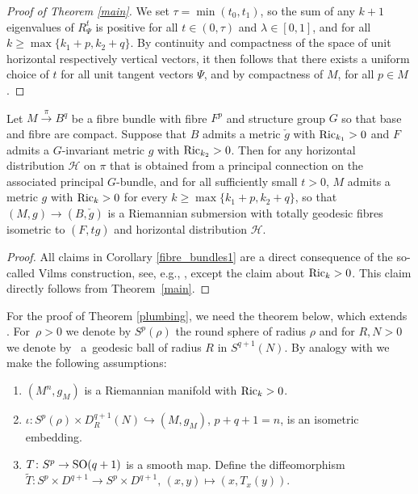 \begin{proof}[Proof of Theorem \ref{main}]
	We set $\tau=\min(t_0,t_1)$, so the sum of any $k+1$ eigenvalues of $R_\Psi^t$ is positive for all $t\in(0,\tau)$ and $\lambda\in[0,1]$, and for all $k\geq \max\{k_1+p,k_2+q\}$. By continuity and compactness of the space of unit horizontal respectively vertical vectors, it then follows that there exists a uniform choice of $t$ for all unit tangent vectors $\Psi$, and by compactness of $M$, for all $p\in M$.
\end{proof}


\begin{Corollary}\label{fibre_bundles1}
	Let $M\xrightarrow{\pi}B^q$ be a fibre bundle with fibre $F^p$ and structure group $G$ so that base and fibre are compact. Suppose that $B$ admits a metric $\check{g}$ with ${\rm Ric}_{k_1}>0$ and $F$ admits a $G$-invariant metric $\hat{g}$ with ${\rm Ric}_{k_2}>0$. Then for any horizontal distribution $\mathcal{H}$ on $\pi$ that is obtained from a principal connection on the associated principal $G$-bundle, and for all sufficiently small $t>0$, $M$ admits a metric $g$ with ${\rm Ric}_k>0$ for every $k\ge \max\{k_1+p,k_2+q\}$, so that $(M,g)\to (B,\check{g})$ is a Riemannian submersion with totally geodesic fibres isometric to $(F,t\hat{g})$ and horizontal distribution $\mathcal{H}$.
\end{Corollary}

\begin{proof}
	All claims in Corollary \ref{fibre_bundles1} are a direct consequence of the so-called Vilms construction, see, e.g., \cite[Theorem~9.59]{Be}, except the claim about ${\rm Ric}_k>0$. This claim directly follows from Theorem~\ref{main}.
\end{proof}

For the proof of Theorem \ref{plumbing}, we need the theorem below, which extends \cite[Theorem~C]{RW}. For~${\rho>0}$ we denote by $S^p(\rho)$ the round sphere of radius $\rho$ and for $R,N>0$ we denote by~ a~geodesic ball of radius $R$ in $S^{q+1}(N)$. By analogy with \cite{Wr2} we make the following assumptions:
\begin{enumerate}[label=\textnormal{(\arabic*)}]\itemsep=0pt
	\item $(M^n,g_M)$ is a Riemannian manifold with ${\rm Ric}_k>0$.
	\item $\iota\colon S^p(\rho)\times D_R^{q+1}(N)\hookrightarrow (M,g_M)$, $p+q+1=n$, is an isometric embedding.
	\item $T\colon S^p\to {\rm SO}(q+1)$ is a smooth map. Define the diffeomorphism $\tilde{T}\colon S^p\times D^{q+1}\to S^p\times D^{q+1},\, (x,y)\mapsto (x,T_x(y))$.
\end{enumerate}

